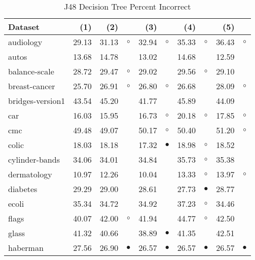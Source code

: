 \begin{table}[thb]
\caption{\label{j48pi}J48 Decision Tree Percent Incorrect}
\footnotesize
{\centering \begin{tabular}{lrr@{\hspace{0.1cm}}cr@{\hspace{0.1cm}}cr@{\hspace{0.1cm}}cr@{\hspace{0.1cm}}c}
\\
\hline
Dataset & (1)& (2) & & (3) & & (4) & & (5) & \\
\hline
audiology & 29.13 & 31.13 &   $\circ$ & 32.94 &   $\circ$ & 35.33 &   $\circ$ & 36.43 &   $\circ$\\
autos & 13.68 & 14.78 &           & 13.02 &           & 14.68 &           & 12.59 &          \\
balance-scale & 28.72 & 29.47 &   $\circ$ & 29.02 &           & 29.56 &   $\circ$ & 29.10 &          \\
breast-cancer & 25.70 & 26.91 &   $\circ$ & 26.80 &   $\circ$ & 26.68 &           & 28.09 &   $\circ$\\
bridges-version1 & 43.54 & 45.20 &           & 41.77 &           & 45.89 &           & 44.09 &          \\
car & 16.03 & 15.95 &           & 16.73 &   $\circ$ & 20.18 &   $\circ$ & 17.85 &   $\circ$\\
cmc & 49.48 & 49.07 &           & 50.17 &   $\circ$ & 50.40 &           & 51.20 &   $\circ$\\
colic & 18.03 & 18.18 &           & 17.32 & $\bullet$ & 18.98 &   $\circ$ & 18.52 &          \\
cylinder-bands & 34.06 & 34.01 &           & 34.84 &           & 35.73 &   $\circ$ & 35.38 &          \\
dermatology & 10.97 & 12.26 &           & 10.04 &           & 13.33 &   $\circ$ & 13.97 &   $\circ$\\
diabetes & 29.29 & 29.00 &           & 28.61 &           & 27.73 & $\bullet$ & 28.77 &          \\
ecoli & 35.34 & 34.72 &           & 34.92 &           & 37.23 &   $\circ$ & 34.46 &          \\
flags & 40.07 & 42.00 &   $\circ$ & 41.94 &           & 44.77 &   $\circ$ & 42.50 &          \\
glass & 41.32 & 40.66 &           & 38.89 & $\bullet$ & 41.35 &           & 42.51 &          \\
haberman & 27.56 & 26.90 & $\bullet$ & 26.57 & $\bullet$ & 26.57 & $\bullet$ & 26.57 & $\bullet$\\

\end{tabular}}
\end{table}
